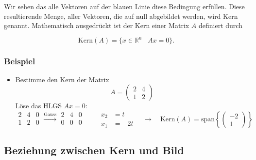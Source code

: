 Wir sehen das alle Vektoren auf der blauen Linie diese Bedingung erfüllen. Diese resultierende Menge, aller Vektoren, die auf null abgebildet werden, wird Kern genannt. Mathematisch ausgedrückt ist der Kern einer Matrix \( A \) definiert durch

\begin{equation*}
    \text{Kern}(A) = \{ x \in \mathbb{R}^n \mid Ax = 0 \}.
\end{equation*}

\subsubsection*{Beispiel}

\begin{itemize}
    \item Bestimme den Kern der Matrix
    \begin{equation*}
        A = \begin{pmatrix} 2 & 4 \\ 1 & 2 \end{pmatrix}
    \end{equation*}
    Löse das HLGS \( Ax = 0 \):
    \begin{equation*}
        \begin{array}{cc|c}
            2 & 4 & 0 \\
            1 & 2 & 0 \\
        \end{array} \xrightarrow{\text{Gauss}}
        \begin{array}{cc|c}
            2 & 4 & 0 \\
            0 & 0 & 0 \\
        \end{array} \qquad
        \begin{aligned}
            x_2 &= t \\
            x_1 &= -2t 
        \end{aligned} \quad \rightarrow \quad \text{Kern}(A) = \text{span} \left\{ 
        \begin{pmatrix}
            -2 \\ 1 
        \end{pmatrix} \right\}
    \end{equation*} 
\end{itemize}

\subsection{Beziehung zwischen Kern und Bild}

